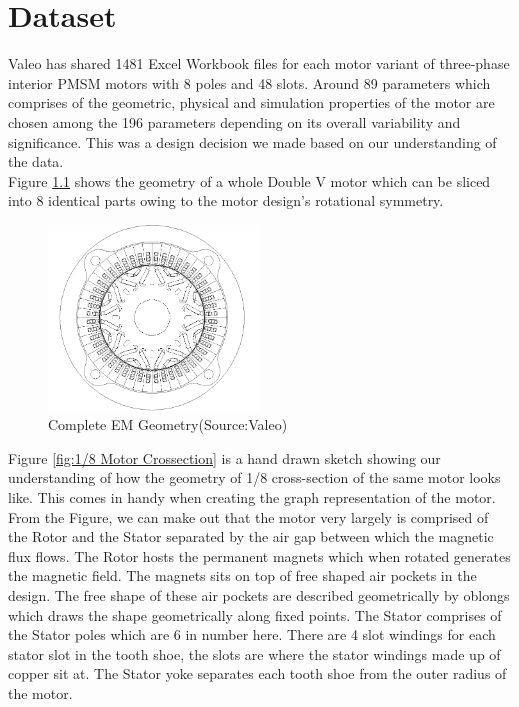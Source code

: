 \documentclass{report} %
\begin{document}
\newpage 

\chapter{Dataset} 

Valeo has shared 1481 Excel Workbook files for each motor variant of three-phase interior \ac{PMSM} motors with 8 poles and 48 slots. 
Around 89 parameters which comprises of the geometric, physical and simulation properties of the motor are chosen among the 196 parameters depending on its overall variability and significance.
This was a design decision we made based on our understanding of the data.\\
Figure \ref{fig:Full Motor} shows the geometry of a whole Double V motor which can be sliced into 8 identical parts owing to the motor design's rotational symmetry.
\begin{figure}[H]
    \centering
    \includegraphics[width=0.5\textwidth]{./ReportImages/FullMotorv2.png} 
    \caption{Complete EM Geometry(Source:Valeo)}
    \label{fig:Full Motor}
\end{figure}
Figure \ref{fig:1/8 Motor Crossection} is a hand drawn sketch showing our understanding of how the geometry of 1/8 cross-section of the same motor looks like.
This comes in handy when creating the graph representation of the motor.
From the Figure, we can make out that the motor very largely is comprised of the Rotor and the Stator separated by the air gap between which the magnetic flux flows.
The Rotor hosts the permanent magnets which when rotated generates the magnetic field. The magnets sits on top of free shaped air pockets in the design. 
The free shape of these air pockets are described geometrically by oblongs which draws the shape geometrically along fixed points.
The Stator comprises of the Stator poles which are 6 in number here. There are 4 slot windings for each stator slot in the tooth shoe, the slots are where the stator windings made 
up of copper sit at. The Stator yoke separates each tooth shoe from the outer radius of the motor.
\end{document}
